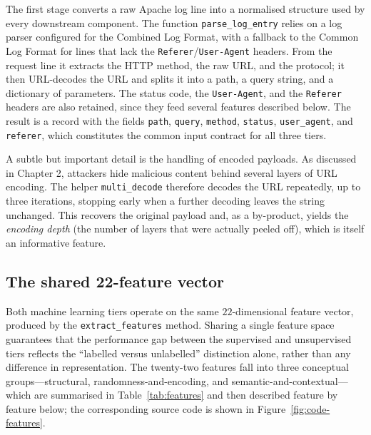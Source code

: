\documentclass[../main.tex]{subfiles}
\begin{document}
The first stage converts a raw Apache log line into a normalised structure
used by every downstream component. The function \texttt{parse\_log\_entry}
relies on a log parser configured for the Combined Log Format, with a
fallback to the Common Log Format for lines that lack the
\texttt{Referer}/\texttt{User-Agent} headers. From the request line it
extracts the HTTP method, the raw URL, and the protocol; it then URL-decodes
the URL and splits it into a path, a query string, and a dictionary of
parameters. The status code, the \texttt{User-Agent}, and the
\texttt{Referer} headers are also retained, since they feed several
features described below. The result is a record with the fields
\texttt{path}, \texttt{query}, \texttt{method}, \texttt{status},
\texttt{user\_agent}, and \texttt{referer}, which constitutes the common
input contract for all three tiers.

A subtle but important detail is the handling of encoded payloads. As
discussed in Chapter 2, attackers hide malicious content
behind several layers of URL encoding. The helper \texttt{multi\_decode}
therefore decodes the URL repeatedly, up to three iterations, stopping early
when a further decoding leaves the string unchanged. This recovers the
original payload and, as a by-product, yields the \emph{encoding depth}
(the number of layers that were actually peeled off), which is itself an
informative feature.

\subsection{The shared 22-feature vector}

Both machine learning tiers operate on the same $22$-dimensional feature
vector, produced by the \texttt{extract\_features} method. Sharing a single
feature space guarantees that the performance gap between the supervised and
unsupervised tiers reflects the ``labelled versus unlabelled'' distinction
alone, rather than any difference in representation. The twenty-two features
fall into three conceptual groups---structural, randomness-and-encoding, and
semantic-and-contextual---which are summarised in Table~\ref{tab:features} and
then described feature by feature below; the corresponding source code is shown
in Figure~\ref{fig:code-features}.
\end{document}
